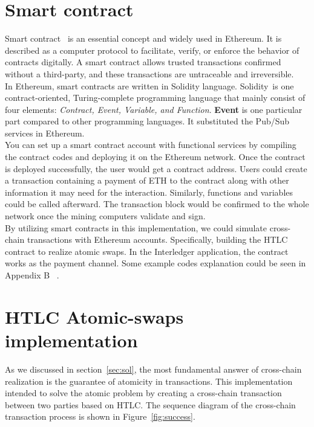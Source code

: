
\section{Smart contract}
\noindent Smart contract~\cite{governatori2018legal} is an essential concept and widely used in Ethereum. It is described as a computer protocol to facilitate, verify, or enforce the behavior of contracts digitally. A smart contract allows trusted transactions confirmed without a third-party, and these transactions are untraceable and irreversible. \\

\noindent In Ethereum, smart contracts are written in Solidity language. Solidity~\cite{dannen2017introducing}is one contract-oriented, Turing-complete programming language that mainly consist of four elements: \textit{Contract, Event, Variable, and Function}. \textbf{Event} is one particular part compared to other programming languages. It substituted the Pub/Sub services in Ethereum.\\

\noindent You can set up a smart contract account with functional services by compiling the contract codes and deploying it on the Ethereum network. Once the contract is deployed successfully, the user would get a contract address.  Users could create a transaction containing a payment of ETH to the contract along with other information it may need for the interaction. Similarly, functions and variables could be called afterward. The transaction block would be confirmed to the whole network once the mining computers validate and sign.\\

\noindent By utilizing smart contracts in this implementation, we could simulate cross-chain transactions with Ethereum accounts. Specifically, building the HTLC contract to realize atomic swaps. In the Interledger application, the contract works as the payment channel. Some example codes explanation could be seen in Appendix B ~.

\section{HTLC Atomic-swaps implementation}
\label{sec:atomic}
\noindent As we discussed in section~\ref{sec:sol}, the most fundamental answer of cross-chain realization is the guarantee of atomicity in transactions. This implementation intended to solve the atomic problem by creating a cross-chain transaction between two parties based on HTLC. The sequence diagram of the cross-chain transaction process is shown in Figure~\ref{fig:success}.\\

